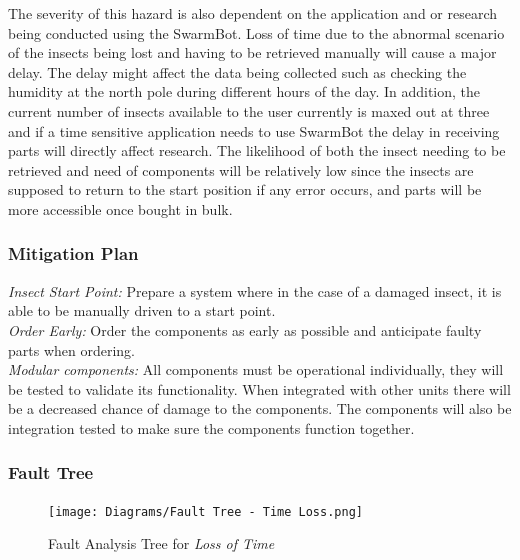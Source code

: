 \documentclass[11pt]{article}
\begin{document}
The severity of this hazard is also dependent on the application and or research being conducted using the SwarmBot. Loss of time due to the abnormal scenario of the insects being lost and having to be retrieved manually will cause a major delay. The delay might affect the data being collected such as checking the humidity at the north pole during different hours of the day. In addition, the current number of insects available to the user currently is maxed out at three and if a time sensitive application needs to use SwarmBot the delay in receiving parts will directly affect research. The likelihood of both the insect needing to be retrieved and need of components will be relatively low since the insects are supposed to return to the start position if any error occurs, and parts will be more accessible once bought in bulk. 

\subsubsection*{Mitigation Plan}
\textit{Insect Start Point:} Prepare a system where in the case of a damaged insect, it is able to be manually driven to a start point. \\
\textit{Order Early:} Order the components as early as possible and anticipate faulty parts when ordering. \\
\textit{Modular components:} All components must be operational individually, they will be tested to validate its functionality. When integrated with other units there will be a decreased chance of damage to the components. The components will also be integration tested to make sure the components function together. \\

\subsubsection*{Fault Tree}
\begin{figure}[H]
   \centering
   \texttt{[image: Diagrams/Fault Tree - Time Loss.png]}
   \caption{Fault Analysis Tree for \textit{Loss of Time}}
   \label{fig:ft-Time}
\end{figure}
\end{document}
